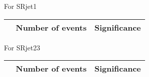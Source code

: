 \begin{frame}{For SRjet1}
\vspace{5mm}
\begin{tabular}{|c|c|c|}
\hline
& Number of events & Significance \\
\hline

\end{tabular}
\end{frame}

\begin{frame}{For SRjet23}
\vspace{5mm}
\begin{tabular}{|c|c|c|}
\hline
& Number of events & Significance \\
\hline

\end{tabular}
\end{frame}

